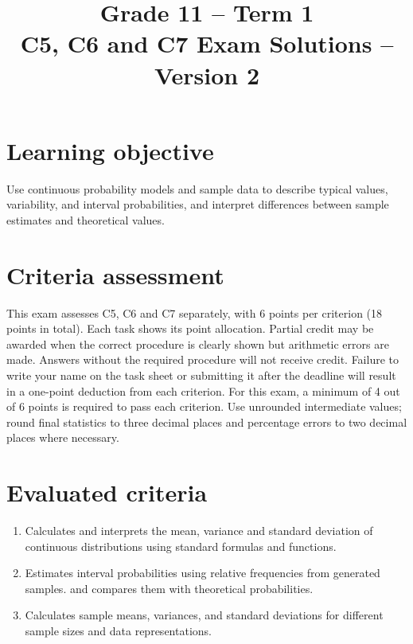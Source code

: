 \makeatletter
{}
\makeatother



\title{Grade 11 -- Term 1 \\ C5, C6 and C7 Exam Solutions -- Version 2}
\author{}
\date{}


\maketitle
\vspace{-2cm}
\setcounter{tocdepth}{1}
\setcounter{secnumdepth}{2}
\label{toc}
\tableofcontents

\section*{Learning objective}\vspace{-5mm}
Use continuous probability models and sample data to describe typical values,
variability, and interval probabilities, and interpret differences between
sample estimates and theoretical values.

\section*{Criteria assessment}\vspace{-5mm}
This exam assesses C5, C6 and C7 separately, with 6 points per criterion
(18 points in total). Each task shows its point allocation. Partial credit
may be awarded when the correct procedure is clearly shown but arithmetic
errors are made. Answers without the required procedure will not receive credit.
Failure to write your name on the task sheet or submitting it after the deadline
will result in a one-point deduction from each criterion.
For this exam, a minimum of 4 out of 6 points is required to pass each criterion.
Use unrounded intermediate values; round final statistics to three decimal
places and percentage errors to two decimal places where necessary.

\section*{Evaluated criteria}
\begin{enumerate}[label=\textbf{C\arabic*},start=5]
\item Calculates and interprets the mean, variance and standard deviation of continuous distributions using standard formulas and functions.
\item Estimates interval probabilities using relative frequencies from generated samples.
 and compares them with theoretical probabilities.
\item Calculates sample means, variances, and standard deviations for different sample sizes and data representations.
\end{enumerate}


